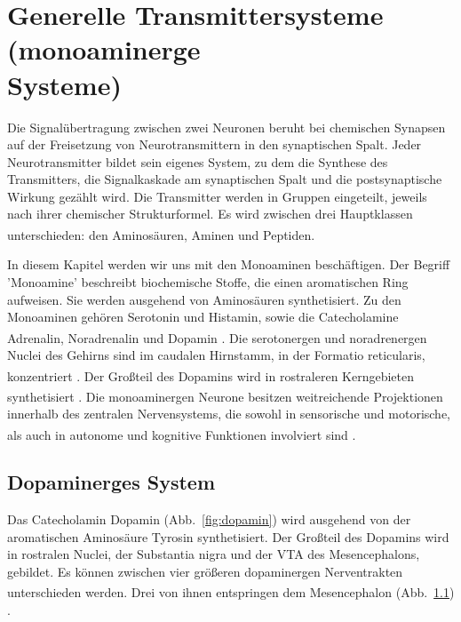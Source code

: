 \documentclass[12pt,a4paper,pdftex]{article}
\begin{document}
\newpage
\section[Generelle Transmittersysteme (monoaminerge Systeme)]{Generelle Transmittersysteme (monoaminerge \\Systeme)}
\label{sec:transmittersysteme}

Die Signalübertragung zwischen zwei Neuronen beruht bei chemischen Synapsen auf der Freisetzung von Neurotransmittern in den synaptischen Spalt. Jeder Neurotransmitter bildet sein eigenes System, zu dem die Synthese des Transmitters, die Signalkaskade am synaptischen Spalt und die postsynaptische Wirkung gezählt wird. 
Die Transmitter werden in Gruppen eingeteilt, jeweils nach ihrer chemischer Strukturformel. Es wird zwischen drei Hauptklassen unterschieden: den Aminosäuren, Aminen und Peptiden. \textsuperscript{\cite[6]{neurowissenschaften_baer}}

In diesem Kapitel werden wir uns mit den Monoaminen beschäftigen.
Der Begriff 'Monoamine'  beschreibt biochemische Stoffe, die einen aromatischen Ring aufweisen. Sie werden ausgehend von Aminosäuren synthetisiert. Zu den Monoaminen gehören Serotonin und Histamin, sowie die Catecholamine Adrenalin, Noradrenalin und Dopamin \textsuperscript{\cite[46]{kandel2013principles}}. Die serotonergen und noradrenergen Nuclei des Gehirns sind im caudalen Hirnstamm, in der Formatio reticularis, konzentriert \textsuperscript{\cite[7]{trepel2011neuroanatomie}}.
Der Großteil des Dopamins wird in rostraleren Kerngebieten synthetisiert \textsuperscript{\cite[63]{kandel2013principles}}.
Die monoaminergen Neurone besitzen weitreichende Projektionen innerhalb des zentralen Nervensystems, die sowohl in sensorische und motorische, als auch in autonome und kognitive Funktionen involviert sind \textsuperscript{\cite[9]{crossman2014neuroanatomy}}.


\subsection{Dopaminerges System}
\label{dopaminerges_system}
Das Catecholamin Dopamin (Abb.~\ref{fig:dopamin}) wird ausgehend von der aromatischen Aminosäure Tyrosin synthetisiert. Der Großteil des Dopamins wird in rostralen Nuclei, der Substantia nigra  und der VTA des Mesencephalons, gebildet. Es können zwischen vier größeren dopaminergen Nerventrakten unterschieden werden. Drei von ihnen entspringen dem Mesencephalon (Abb.~\ref{dopaminerges_system}) \textsuperscript{\cite[13]{kandel2013principles}}. 
\end{document}

